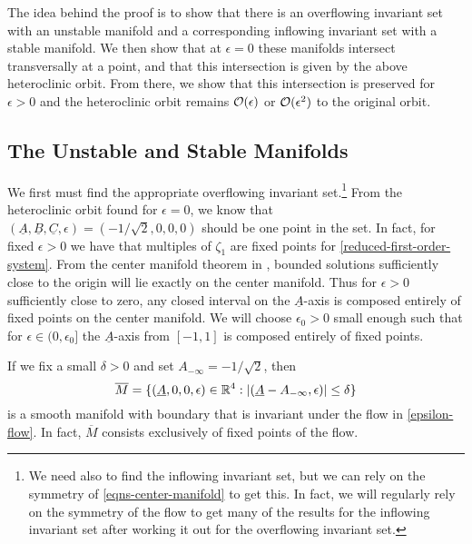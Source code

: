 The idea behind the proof is to show that there is an overflowing invariant set with an unstable manifold and a corresponding inflowing invariant set with a stable manifold. We then show that at \(\epsilon = 0\) these manifolds intersect transversally at a point, and that this intersection is given by the above heteroclinic orbit. From there, we show that this intersection is preserved for \(\epsilon > 0\) and the heteroclinic orbit remains \(\mathcal{O}(\epsilon)\) or \(\mathcal{O}(\epsilon^2)\) to the original orbit.

\subsection{The Unstable and Stable Manifolds}

We first must find the appropriate overflowing invariant set.\footnote{We need also to find the inflowing invariant set, but we can rely on the symmetry of \cref{eqns-center-manifold} to get this. In fact, we will regularly rely on the symmetry of the flow to get many of the results for the inflowing invariant set after working it out for the overflowing invariant set.} From the heteroclinic orbit found for \(\epsilon = 0\), we know that \((\underline A,\underline B,\underline C, \epsilon) = (-1/\sqrt 2 , 0 ,0, 0)\) should be one point in the set. In fact, for fixed \(\epsilon> 0\) we have that multiples of \(\zeta_1\) are fixed points for \cref{reduced-first-order-system}. From the center manifold theorem in \cite{vanderbauwhede1992center}, bounded solutions sufficiently close to the origin will lie exactly on the center manifold. Thus for \(\epsilon>0\) sufficiently close to zero, any closed interval on the \(\underline A\)-axis is composed entirely of fixed points on the center manifold. We will choose \(\epsilon_0> 0\) small enough such that for \(\epsilon \in (0,\epsilon_0]\) the \(\underline A\)-axis from \([-1,1]\) is composed entirely of fixed points. 



If we fix a small \(\delta > 0\) and set \(A_{-\infty} = - 1/ \sqrt 2\), then 
\begin{equation}
	\overline M = \{(\underline A, 0, 0, \epsilon) \in \mathbb{R}^4: |(\underline A - A_{-\infty},  \epsilon)| \leq \delta\}
\end{equation}
is a smooth manifold with boundary that is invariant under the flow in \cref{epsilon-flow}. In fact, \(\overline M\) consists exclusively of fixed points of the flow.

